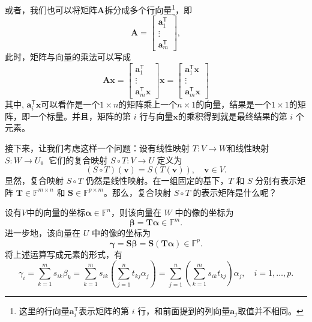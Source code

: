或者，我们也可以将矩阵\( \mathbf{A} \)拆分成多个行向量\footnote{这里的行向量\( \bm{a}_i^{\mathsf{T}} \)表示矩阵的第 \(i\) 行，和前面提到的列向量\( \bm{a}_j \)取值并不相同。}，即
\[
    \mathbf{A}=
    \begin{bmatrix}
        \bm a^{\mathsf T}_1 \\
        \vdots              \\
        \bm a^{\mathsf T}_m
    \end{bmatrix},
\]
此时，矩阵与向量的乘法可以写成
\[
    \mathbf{A}\bm x =
    \begin{bmatrix}
        \bm a^{\mathsf T}_1 \\
        \vdots              \\
        \bm a^{\mathsf T}_m\bm x
    \end{bmatrix} \bm{x} =
    \begin{bmatrix}
        \bm a^{\mathsf T}_1\bm x \\
        \vdots                   \\
        \bm a^{\mathsf T}_m\bm x
    \end{bmatrix}
\]
其中, \( \bm a^{\mathsf T}_i\bm x \)可以看作是一个\( 1 \times n \)的矩阵乘上一个\( n \times 1 \)的向量，结果是一个\( 1 \times 1 \)的矩阵，即一个标量。并且，矩阵的第 \(i\) 行与向量\( \bm{x} \)的乘积得到就是最终结果的第 \(i\) 个元素。

接下来，让我们考虑这样一个问题：设有线性映射 \(T:V\to W\)和线性映射 \(S:W\to U\)。它们的复合映射 \(S\circ T:V\to U\) 定义为
\[
    (S\circ T)(\bm v) = S(T(\bm v)), \quad \bm v\in V.
\]
显然，复合映射 \(S\circ T\) 仍然是线性映射。在一组固定的基下，\(T\) 和 \(S\) 分别有表示矩阵 \(\mathbf{T} \in \mathbb{F}^{m \times n}\) 和 \(\mathbf{S} \in \mathbb{F}^{p \times m}\)。那么，复合映射 \(S\circ T\) 的表示矩阵是什么呢？

设有\( V \)中的向量的坐标\( \bm{\alpha} \in \mathbb{F}^n \)，则该向量在 \(W\) 中的像的坐标为
\[
    \bm{\beta} = \mathbf{T}\bm{\alpha} \in \mathbb{F}^m.
\]
进一步地，该向量在 \(U\) 中的像的坐标为
\[
    \bm{\gamma} = \mathbf{S}\bm{\beta} = \mathbf{S}(\mathbf{T}\bm{\alpha}) \in \mathbb{F}^p.
\]
将上述运算写成元素的形式，有
\[
    \gamma_i = \sum_{k=1}^{m} s_{ik}\beta_k = \sum_{k=1}^{m} s_{ik}\left(\sum_{j=1}^{n} t_{kj}\alpha_j\right) = \sum_{j=1}^{n}\left(\sum_{k=1}^{m} s_{ik}t_{kj}\right)\alpha_j, \quad i = 1, \ldots, p.
\]

